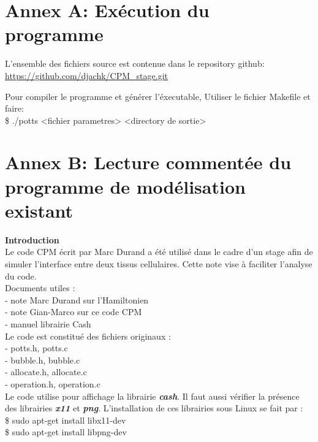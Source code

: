 \documentclass[11pt,a4paper]{article}
\begin{document}
\newpage

\appendix

\section{Annex A: Exécution du programme}

L'ensemble des fichiers source est contenue dans le repository github:
\url{https://github.com/djachk/CPM_stage.git}


Pour compiler le programme et générer l'éxecutable, Utiliser le fichier Makefile et faire:\\
\$ ./potts <fichier parametres>  <directory de sortie>




\section{Annex B: Lecture commentée du programme de modélisation existant}

\textbf{Introduction}\\

Le code CPM écrit par Marc Durand a été utilisé dans le cadre d'un stage afin de simuler l'interface entre deux tissus cellulaires. Cette note vise à faciliter l'analyse du code.\\



Documents utiles :\\
- note Marc Durand sur l'Hamiltonien\\
- note Gian-Marco sur ce code CPM\\
- manuel librairie Cash\\

Le code est constitué des fichiers originaux :\\
- potts.h, potts.c\\
- bubble.h, bubble.c\\
- allocate.h, allocate.c\\
- operation.h, operation.c\\

Le code utilise pour affichage la librairie \textbf{\textit{cash}}.
Il faut aussi vérifier la présence des librairies \textbf{\textit{x11}} et \textbf{\textit{png}}. L’installation de ces librairies sous Linux se fait par :\\
\$ sudo apt-get install libx11-dev\\
\$ sudo apt-get install libpng-dev\\
\end{document}
